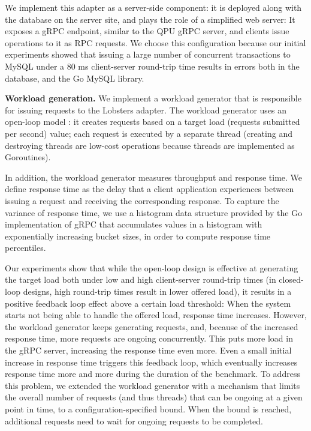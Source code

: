 We implement this adapter as a server-side component:
it is deployed along with the database on the server site, and plays the role of a simplified web server:
It exposes a gRPC endpoint, similar to the QPU gRPC server, and clients issue operations to it as RPC requests.
We choose this configuration because our initial experiments showed that issuing a large number of concurrent transactions
to MySQL under a 80 ms client-server round-trip time results in errors both in the database,
and the Go MySQL library.

\bigskip
\noindent
\textbf{Workload generation.}
We implement a workload generator \cite{lobsters:bench} that is responsible for issuing
requests to the Lobsters adapter.
The workload generator uses an open-loop model \cite{schroeder:cautionarytale}:
it creates requests based on a target load (requests submitted per second) value;
each request is executed by a separate thread (creating and destroying threads are low-cost operations because threads are
implemented as Goroutines).

In addition, the workload generator measures throughput and response time.
We define response time as the delay that a client application experiences between issuing a request and receiving the
corresponding response.
To capture the variance of response time, we use a histogram data structure provided by the Go implementation of gRPC \cite{grpcgo:histogram}
that accumulates values in a histogram with exponentially increasing bucket sizes, in order to compute response time percentiles.

Our experiments show that while the open-loop design is effective at generating the target load
both under low and high client-server round-trip times (in closed-loop designs, high round-trip times result in lower offered load),
it results in a positive feedback loop effect above a certain load threshold:
When the system starts not being able to handle the offered load, response time increases.
However, the workload generator keeps generating requests, and, because of the increased response time,
more requests are ongoing concurrently.
This puts more load in the gRPC server, increasing the response time even more.
Even a small initial increase in response time triggers this feedback loop,
which eventually increases response time more and more during the duration of the benchmark.
To address this problem, we extended the workload generator with a mechanism that limits the overall number of requests
(and thus threads) that can be ongoing at a given point in time, to a configuration-specified bound.
When the bound is reached, additional requests need to wait for ongoing requests to be completed.

